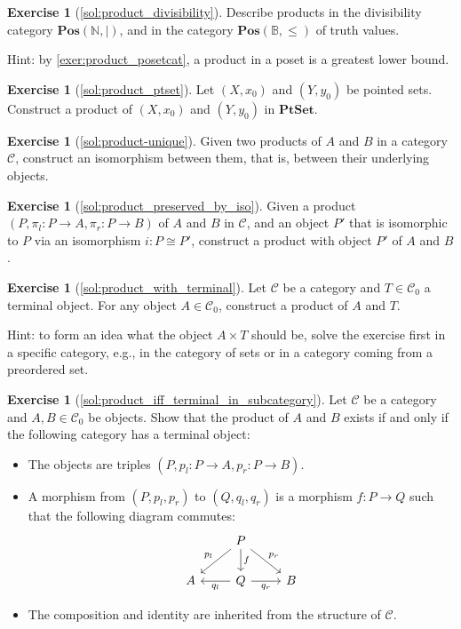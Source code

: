 \documentclass[a4paper,11pt, oneside,titlepage=false]{scrbook}
\theoremstyle{plain}
\theoremstyle{definition}
\newtheorem{exer}[thm]{Exercise}
\newcommand{\Cat}[1]{\mathcal{#1}}
\newcommand{\CC}{\Cat{C}}
\newcommand{\Catb}[1]{\mathbf{#1}}
\newcommand{\PTSET}{\Catb{PtSet}}
\newcommand{\POS}{\Catb{Pos}}
\newcommand{\Ob}[1]{{#1}_0}
\newcommand{\projl}{\ensuremath{\pi_l}}
\newcommand{\projr}{\ensuremath{\pi_r}}
\newcommand{\NN}{\ensuremath{\mathbb{N}}}
\begin{document}
\begin{exer}[\cref{sol:product_divisibility}]\label{exer:product_divisibility}
  Describe products in the divisibility category $\POS(\NN, \mid)$, and in the
  category $\POS(\mathbb{B}, \leq)$ of truth values.

  Hint: by \cref{exer:product_posetcat}, a product in a poset is a greatest
  lower bound.
\end{exer}

\begin{exer}[\cref{sol:product_ptset}]\label{exer:product_ptset}
  Let $(X, x_0)$ and $(Y, y_0)$ be pointed sets.
  Construct a product of $(X,x_0)$ and $(Y,y_0)$ in $\PTSET$.
\end{exer}

\begin{exer}[\cref{sol:product-unique}]\label{exer:product-unique}
  Given two products of $A$ and $B$ in a category $\CC$, construct an isomorphism between them, that is, between their underlying objects.
\end{exer}

\begin{exer}[\cref{sol:product_preserved_by_iso}]\label{exer:product_preserved_by_iso}
  Given a product $(P,\projl : P \to A ,\projr : P \to B)$ of $A$ and $B$ in $\CC$, and an object $P'$ that is isomorphic to $P$ via an isomorphism $i : P \cong P'$, construct a product with object $P'$ of $A$ and $B$.
\end{exer}

\begin{exer}[\cref{sol:product_with_terminal}]\label{exer:product_with_terminal} Let $\CC$ be a category and $T\in\Ob{\CC}$ a terminal object.
  For any object $A\in \Ob{\CC}$, construct a product of $A$ and $T$.

  Hint: to form an idea what the object $A \times T$ should be, solve the exercise first in a specific category, e.g., in the category of sets or in a category coming from a preordered set.
\end{exer}




\begin{exer}[\cref{sol:product_iff_terminal_in_subcategory}]\label{exer:product_iff_terminal_in_subcategory} Let $\CC$ be a category and $A,B\in\Ob{\CC}$ be objects. Show that the product of $A$ and $B$ exists if and only if the following category has a terminal object:
\begin{itemize}
\item The objects are triples $(P,p_l: P\to A, p_r:P\to B)$.
\item A morphism from $(P,p_l,p_r)$ to $(Q,q_l,q_r)$ is a morphism $f : P \to Q$ such that the following diagram commutes:
\[
\begin{tikzcd}
& P \arrow[ld,swap, "p_l"] \arrow[rd, "p_r"] \arrow[d, "f"] & \\
A & Q \arrow[l, "q_l"]  \arrow[r,swap, "q_r"] & B
\end{tikzcd}
\]
\item The composition and identity are inherited from the structure of $\CC$.
\end{itemize}
\end{exer}
\end{document}
